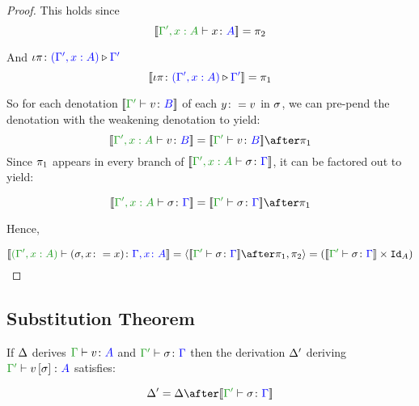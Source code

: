 \documentclass{report}
\begin{document}
\begin{framed}
    \begin{proof}
        This holds since 
        \begin{equation}
            \deno{\typerelation{\G', x:A}{x}{A}} = \pp
        \end{equation}
        
        And $\iota\pi \colon {\color{blue}(\Gamma',x:A)} \triangleright {\color {blue} \Gamma'}$
        \begin{equation}
            {\bf [\![}\iota\pi \colon {\color{blue}(\Gamma',x:A)} \triangleright {\color {blue} \Gamma'}{\bf ]\!]} = \pi_1
        \end{equation}
        
        So for each denotation $\deno{\typerelation{\G'}{v}{B}}$ of each $y\colon= v$ in $\sigma$, we can pre-pend the denotation with the weakening denotation to yield: 
        \begin{equation}
            \deno{\typerelation{\G',x:A}{v}{B}} = \deno{\typerelation{\G'}{v}{B}}\after\p
        \end{equation}
        Since $\pi_1$ appears in every branch of $\deno{\typerelation{\G', x:A}{\si}{\G}}$, it can be factored out to yield:
        
        \begin{equation}
            \deno{\typerelation{\G', x:A}{\si}{\G}} = \deno{\typerelation{\G'}{\si}{\G}}\after\p
        \end{equation}
        
        Hence,
        
        \begin{equation}
            \deno{\typerelation{(\G', x:A)}{(\si, x\setto x)}{\gax}} = \pr{\deno{\typerelation{\G'}{\si}{\G}}\after\p}{\pp} = (\deno{\typerelation{\G'}{\si}{\G}}\times \Id{A})
        \end{equation}
    \end{proof}
\end{framed}


\subsection{Substitution Theorem}

\begin{theorem}\label{SubsDenotations}
    If $\Delta$ derives $\gtyperelation{v}{A}$ and $\typerelation{\G'}{\si}{\G}$ then the derivation $\Delta'$ deriving $\typerelation{\G'}{v\ssi}{A}$ satisfies:


\begin{framed}
    \begin{equation}
        \D' = \D \after\deno{\typerelation{\G'}{\si}{\G}}
    \end{equation}
    \centering
\end{framed}
\end{theorem}
\end{document}
